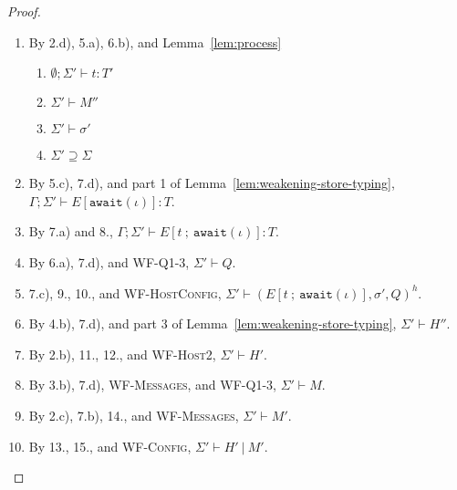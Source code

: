 \begin{proof}
\begin{itemize}
\begin{enumerate}
\begin{enumerate}[label=(\alph*)]
  \end{enumerate}
\item By 2.d), 5.a), 6.b), and Lemma~\ref{lem:process}
  \begin{enumerate}[label=(\alph*)]
  \item $\emptyset ; \Sigma' \vdash t : T'$
  \item $\Sigma' \vdash M''$
  \item $\Sigma' \vdash \sigma'$
  \item $\Sigma' \supseteq \Sigma$
  \end{enumerate}
\item By 5.c), 7.d), and part 1 of Lemma~\ref{lem:weakening-store-typing}, $\Gamma ; \Sigma' \vdash E[\texttt{await}(\iota)] : T$.
\item By 7.a) and 8., $\Gamma ; \Sigma' \vdash E[t~;~\texttt{await}(\iota)] : T$.
\item By 6.a), 7.d), and \textsc{WF-Q1-3}, $\Sigma' \vdash Q$.
\item 7.c), 9., 10., and \textsc{WF-HostConfig}, $\Sigma' \vdash (E[t~;~\texttt{await}(\iota)], \sigma', Q)^h$.
\item By 4.b), 7.d), and part 3 of Lemma~\ref{lem:weakening-store-typing}, $\Sigma' \vdash H''$.
\item By 2.b), 11., 12., and \textsc{WF-Host2}, $\Sigma' \vdash H'$.
\item By 3.b), 7.d), \textsc{WF-Messages}, and \textsc{WF-Q1-3}, $\Sigma' \vdash M$.
\item By 2.c), 7.b), 14., and \textsc{WF-Messages}, $\Sigma' \vdash M'$.
\item By 13., 15., and \textsc{WF-Config}, $\Sigma' \vdash H'~|~M'$.
\end{enumerate}

\end{itemize}

\end{proof}
